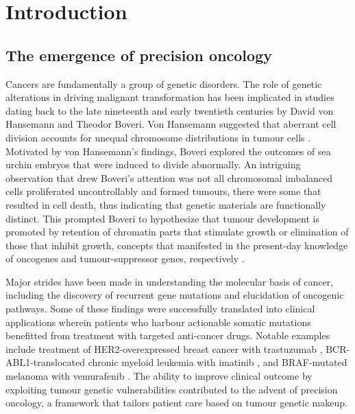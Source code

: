 
\chapter{Introduction}
\label{ch:Introduction}

\section{The emergence of precision oncology}
\label{sec:Theemergenceofprecisiononcology}

Cancers are fundamentally a group of genetic disorders. The role of genetic alterations in driving malignant transformation has been implicated in studies dating back to the late nineteenth and early twentieth centuries by David von Hansemann and Theodor Boveri. Von Hansemann suggested that aberrant cell division accounts for unequal chromosome distributions in tumour cells \cite{VonHansemann1890, Paget2006}. Motivated by von Hansemann's findings, Boveri explored the outcomes of sea urchin embryos that were induced to divide abnormally. An intriguing observation that drew Boveri's attention was not all chromosomal imbalanced cells proliferated uncontrollably and formed tumours, there were some that resulted in cell death, thus indicating that genetic materials are functionally distinct. This prompted Boveri to hypothesize that tumour development is promoted by retention of chromatin parts that stimulate growth or elimination of those that inhibit growth, concepts that manifested in the present-day knowledge of oncogenes and tumour-suppressor genes, respectively \cite{Boveri1914, Paget2006}.

Major strides have been made in understanding the molecular basis of cancer, including the discovery of recurrent gene mutations and elucidation of oncogenic pathways. Some of these findings were successfully translated into clinical applications wherein patients who harbour actionable somatic mutations benefitted from treatment with targeted anti-cancer drugs. Notable examples include treatment of \acs{HER2}-overexpressed breast cancer with trastuzumab \cite{Slamon1987, Andrulis1998, Sjogren1998, Drebin1985, Vogel2002, Seidman2008}, \acs{BCR-ABL1}-translocated chronic myeloid leukemia with imatinib \cite{Rowley1973, Druker2006}, and \acs{BRAF}-mutated melanoma with vemurafenib \cite{Chapman2011, Ravnan2012}. The ability to improve clinical outcome by exploiting tumour genetic vulnerabilities contributed to the advent of precision oncology, a framework that tailors patient care based on tumour genetic makeup.

